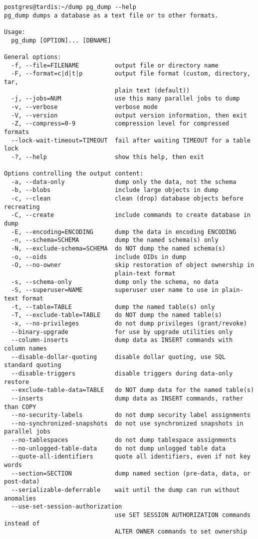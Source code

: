 \begin{verbatim}
postgres@tardis:~/dump pg_dump --help
pg_dump dumps a database as a text file or to other formats.

Usage:
  pg_dump [OPTION]... [DBNAME]

General options:
  -f, --file=FILENAME          output file or directory name
  -F, --format=c|d|t|p         output file format (custom, directory, tar,
                               plain text (default))
  -j, --jobs=NUM               use this many parallel jobs to dump
  -v, --verbose                verbose mode
  -V, --version                output version information, then exit
  -Z, --compress=0-9           compression level for compressed formats
  --lock-wait-timeout=TIMEOUT  fail after waiting TIMEOUT for a table lock
  -?, --help                   show this help, then exit

Options controlling the output content:
  -a, --data-only              dump only the data, not the schema
  -b, --blobs                  include large objects in dump
  -c, --clean                  clean (drop) database objects before recreating
  -C, --create                 include commands to create database in dump
  -E, --encoding=ENCODING      dump the data in encoding ENCODING
  -n, --schema=SCHEMA          dump the named schema(s) only
  -N, --exclude-schema=SCHEMA  do NOT dump the named schema(s)
  -o, --oids                   include OIDs in dump
  -O, --no-owner               skip restoration of object ownership in
                               plain-text format
  -s, --schema-only            dump only the schema, no data
  -S, --superuser=NAME         superuser user name to use in plain-text format
  -t, --table=TABLE            dump the named table(s) only
  -T, --exclude-table=TABLE    do NOT dump the named table(s)
  -x, --no-privileges          do not dump privileges (grant/revoke)
  --binary-upgrade             for use by upgrade utilities only
  --column-inserts             dump data as INSERT commands with column names
  --disable-dollar-quoting     disable dollar quoting, use SQL standard quoting
  --disable-triggers           disable triggers during data-only restore
  --exclude-table-data=TABLE   do NOT dump data for the named table(s)
  --inserts                    dump data as INSERT commands, rather than COPY
  --no-security-labels         do not dump security label assignments
  --no-synchronized-snapshots  do not use synchronized snapshots in parallel jobs
  --no-tablespaces             do not dump tablespace assignments
  --no-unlogged-table-data     do not dump unlogged table data
  --quote-all-identifiers      quote all identifiers, even if not key words
  --section=SECTION            dump named section (pre-data, data, or post-data)
  --serializable-deferrable    wait until the dump can run without anomalies
  --use-set-session-authorization
                               use SET SESSION AUTHORIZATION commands instead of
                               ALTER OWNER commands to set ownership


\end{verbatim}
